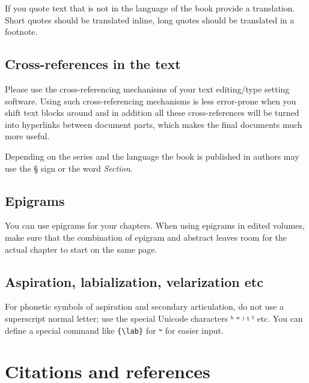 {If you quote text that is not in the language of the book provide a translation. Short quotes should
be translated inline, long quotes should be translated in a footnote.




\subsection{Cross-references in the text}

Please use the cross-referencing mechanisms of your text editing/type setting software. Using such
cross-referencing mechanisms is less error-prone when you shift text blocks around and in addition
all these cross-references will be turned into hyperlinks between document parts, which makes the
final documents much more useful.


 
Depending on the series and the language the book is published in authors may  use the § sign or the word \emph{Section}. 

\subsection{Epigrams}
You can use epigrams for your chapters. When using epigrams in edited volumes, make sure that the combination of epigram and abstract leaves room for the actual chapter to start on the same page.

\subsection{Aspiration, labialization, velarization etc}
For phonetic symbols of aspiration and secondary articulation, do not use a superscript normal letter; use the special Unicode characters ʰ ʷ ʲ ˠ ˤ etc. You can define a special command like \verb+{\lab}+ for ʷ for easier input. 


\section{Citations and references}
\label{sec-references-authors}

}
